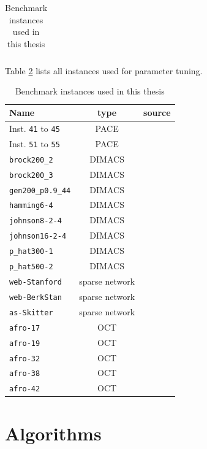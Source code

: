 \documentclass[12pt,a4paper,twoside]{scrartcl}
\numberwithin{equation}{section}
\begin{document}
\begin{table}[hbt!]
\begin{tabular}{l|c|r}
	\end{tabular}
	\caption{Benchmark instances used in this thesis}
	\label{tab:bench_instances}
	
\end{table}
\clearpage
Table \ref{tab:tune_instances} lists all instances used for parameter tuning.

\begin{table}[hbt!]
	\centering
	\begin{tabular}{l|c|r}
		Name & type & source \\ \hline
		Inst. \texttt{41} to \texttt{45} & PACE & \cite{PACE_INST, pace} \\ 
		Inst. \texttt{51} to \texttt{55} & PACE & \cite{PACE_INST, pace} \\\hline
		\texttt{brock200\_2} & DIMACS & \cite{DIMACS} \\
		\texttt{brock200\_3} & DIMACS & \cite{DIMACS} \\
		\texttt{gen200\_p0.9\_44} & DIMACS & \cite{DIMACS} \\
		\texttt{hamming6-4} & DIMACS & \cite{DIMACS} \\
		\texttt{johnson8-2-4} & DIMACS & \cite{DIMACS} \\
		\texttt{johnson16-2-4} & DIMACS & \cite{DIMACS} \\
		\texttt{p\_hat300-1} & DIMACS & \cite{DIMACS} \\
		\texttt{p\_hat500-2} & DIMACS & \cite{DIMACS} \\ \hline	
		\texttt{web-Stanford} & sparse network & \cite{WEB_INST} \\
		\texttt{web-BerkStan} & sparse network & \cite{WEB_INST} \\
		\texttt{as-Skitter} & sparse network & \cite{WEB_INST3} \\ \hline	
		\texttt{afro-17} & OCT & \cite{OCT}	\\	
		\texttt{afro-19} & OCT & \cite{OCT}	\\	
		\texttt{afro-32} & OCT & \cite{OCT}	\\	
		\texttt{afro-38} & OCT & \cite{OCT}	\\	
		\texttt{afro-42} & OCT & \cite{OCT}	\\		
	\end{tabular}
	\caption{Benchmark instances used in this thesis}
	\label{tab:tune_instances}
	
\end{table}
\clearpage

\section{Algorithms}
\end{document}

